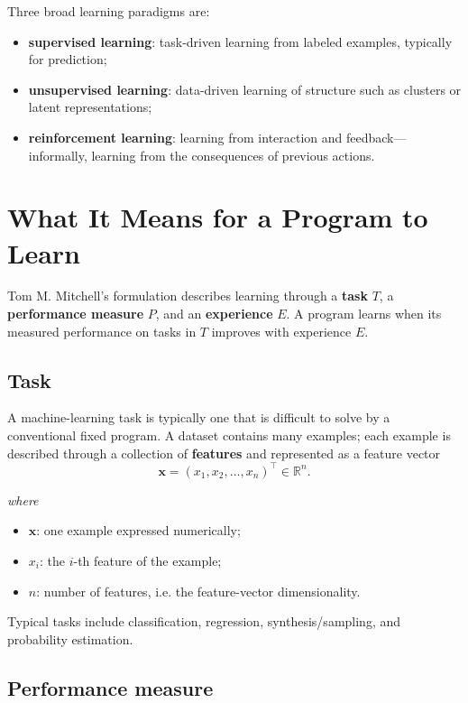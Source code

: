 \documentclass[11pt,a4paper]{report}
\newcommand{\vect}[1]{\bm{#1}}
\newcommand{\R}{\mathbb{R}}
\newcommand{\wherelegend}{\par\smallskip\textit{where}\vspace{-0.3em}}
\begin{document}
Three broad learning paradigms are:
\begin{itemize}
  \item \textbf{supervised learning}: task-driven learning from labeled examples, typically for prediction;
  \item \textbf{unsupervised learning}: data-driven learning of structure such as clusters or latent representations;
  \item \textbf{reinforcement learning}: learning from interaction and feedback---informally, learning from the consequences of previous actions.
\end{itemize}

\section{What It Means for a Program to Learn}

Tom M. Mitchell's formulation describes learning through a \textbf{task} $T$, a \textbf{performance measure} $P$, and an \textbf{experience} $E$. A program learns when its measured performance on tasks in $T$ improves with experience $E$.

\subsection{Task}

A machine-learning task is typically one that is difficult to solve by a conventional fixed program. A dataset contains many examples; each example is described through a collection of \textbf{features} and represented as a feature vector
\begin{equation}
  \vect{x} = (x_1,x_2,\ldots,x_n)^\top \in \R^n.
  \label{eq:feature-vector}
\end{equation}
\wherelegend
\begin{itemize}
  \item $\vect{x}$: one example expressed numerically;
  \item $x_i$: the $i$-th feature of the example;
  \item $n$: number of features, i.e. the feature-vector dimensionality.
\end{itemize}

Typical tasks include classification, regression, synthesis/sampling, and probability estimation.

\subsection{Performance measure}
\end{document}
